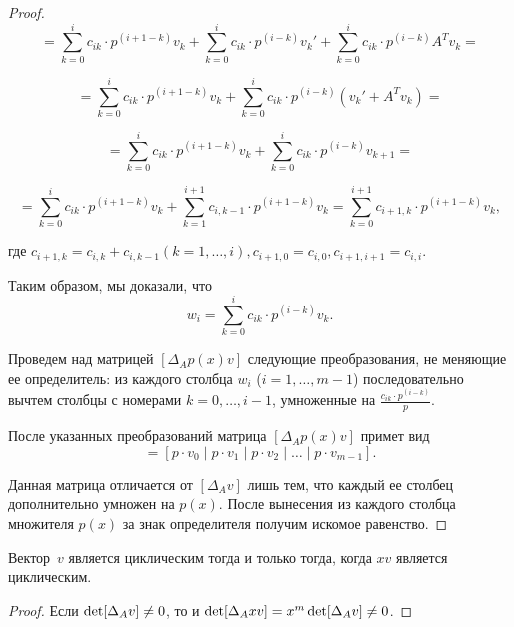 \begin{proof}
\begin{equation*}
    = \sum\limits_{k = 0}^i c_{ik} \cdot p^{(i + 1 - k)} v_k +
    \sum\limits_{k = 0}^i c_{ik} \cdot p^{(i - k)} v_k' + \sum\limits_{k = 0}^i c_{ik} \cdot p^{(i - k)} A^T v_k =
\end{equation*}

\begin{equation*}
    = \sum\limits_{k = 0}^i c_{ik} \cdot p^{(i + 1 - k)} v_k +
    \sum\limits_{k = 0}^i c_{ik} \cdot p^{(i - k)} (v_k' + A^T v_k) =
\end{equation*}

\begin{equation*}
    = \sum\limits_{k = 0}^i c_{ik} \cdot p^{(i + 1 - k)} v_k +
    \sum\limits_{k = 0}^i c_{ik} \cdot p^{(i - k)} v_{k+1} =
\end{equation*}

\begin{equation*}
    = \sum\limits_{k = 0}^i c_{ik} \cdot p^{(i + 1 - k)} v_k +
    \sum\limits_{k = 1}^{i + 1} c_{i,k-1} \cdot p^{(i + 1 - k)} v_{k} =
    \sum\limits_{k = 0}^{i + 1} c_{i + 1,k} \cdot p^{(i + 1 - k)} v_k,
\end{equation*}

где $c_{i + 1,k} = c_{i,k} + c_{i,k - 1} (k = 1, \dots, i), c_{i+1,0} = c_{i,0}, c_{i+1,i+1} = c_{i,i}$.

Таким образом, мы доказали, что
\begin{equation*}
    w_i = \sum\limits_{k = 0}^i c_{ik} \cdot p^{(i - k)} v_k.
\end{equation*}

Проведем над матрицей $[\Delta_A p(x)v]$ следующие преобразования, не меняющие ее определитель:
из каждого столбца $w_{i}$ ($i = 1, \dots, m - 1$) последовательно вычтем столбцы с номерами $k = 0, \dots, i - 1$,
умноженные на $\frac{c_{ik} \cdot p^{(i - k)}}{p}$.

После указанных преобразований матрица $[\Delta_A p(x)v]$ примет вид
\begin{equation*}
    [\Delta_A p(x)v] = [p \cdot v_0 \mid p \cdot v_1 \mid p \cdot v_2 \mid \dots \mid p \cdot v_{m-1}].
\end{equation*}

Данная матрица отличается от $[\Delta_A v]$ лишь тем, что каждый ее столбец дополнительно умножен на $p(x)$.
После вынесения из каждого столбца множителя $p(x)$ за знак определителя получим искомое равенство.

\end{proof}

\begin{consequence}
Вектор~$v$ является циклическим тогда и только тогда, когда $x v$ является циклическим.
\end{consequence}

\begin{proof}
Если $\mathop{\rm det}[\Delta_A v] \neq 0$, то и $\mathop{\rm det}[\Delta_A xv] = x^{m}\mathop{\rm det}[\Delta_A v] \neq 0$.
\end{proof}